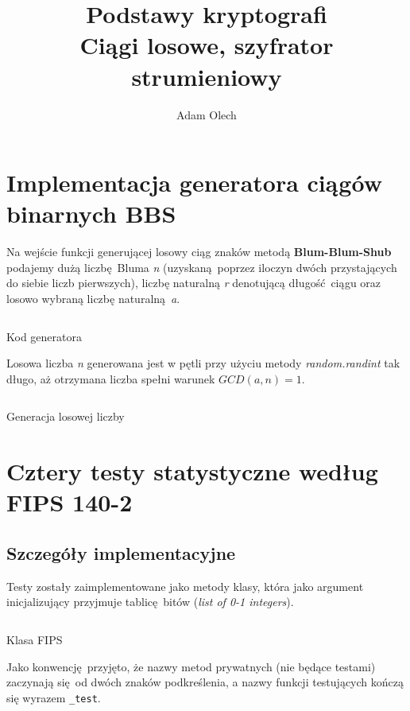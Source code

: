 \documentclass[12pt]{article}
\title{Podstawy kryptografi \\ \large Ciągi losowe, szyfrator strumieniowy}
\author{Adam Olech}
\begin{document}
\maketitle

\section{Implementacja generatora ciągów binarnych BBS}

Na wejście funkcji generującej losowy ciąg znaków metodą \textbf{Blum-Blum-Shub}
podajemy dużą liczbę Bluma \textit{n} 
(uzyskaną poprzez iloczyn dwóch przystających do siebie liczb pierwszych),
liczbę naturalną \textit{r} denotującą długość ciągu
oraz losowo wybraną liczbę naturalną \textit{a}.

\begin{listing}[H]
	\inputminted[firstline=21,lastline=32]{python}{../bbs_generator.py}
	\caption{Kod generatora}
\end{listing}

Losowa liczba \textit{n} generowana jest w pętli przy użyciu metody \textit{random.randint}
tak długo, aż otrzymana liczba spełni warunek $GCD(a,n) = 1$.

\begin{listing}[H]
	\inputminted[firstline=14,lastline=19]{python}{../bbs_generator.py}
	\caption{Generacja losowej liczby}
\end{listing}

\section{Cztery testy statystyczne według FIPS 140-2}

\subsection{Szczegóły implementacyjne}

Testy zostały zaimplementowane jako metody klasy, która jako argument inicjalizujący przyjmuje
tablicę bitów (\textit{list of 0-1 integers}).

\begin{listing}[H]
	\inputminted[firstline=4,lastline=9]{python}{../fips.py}
	\caption{Klasa FIPS}
\end{listing}

Jako konwencję przyjęto, że nazwy metod prywatnych (nie będące testami) zaczynają się od dwóch znaków podkreślenia,
a nazwy funkcji testujących kończą się wyrazem \lstinline{_test}.
\end{document}
